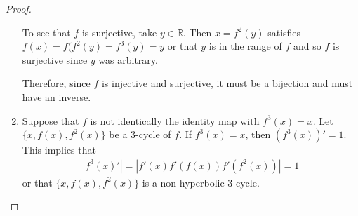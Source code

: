\begin{proof}
\begin{enumerate}
      To see that $f$ is surjective, take $y \in \mathbb{R}$. Then $x = f^2(y)$
      satisfies $f(x) = f(f^2(y) = f^3(y) = y$ or that $y$ is in the range of $f$
      and so $f$ is surjective since $y$ was arbitrary.

      Therefore, since $f$ is injective and surjective, it must be a bijection
      and must have an inverse.
    \item Suppose that $f$ is not identically the identity map with $f^3(x) = x$.
      Let $\{x, f(x), f^2(x)\}$ be a 3-cycle of $f$. If $f^3(x) = x$, then $(f^3(x))' = 1$.
      This implies that
      \begin{align*}
        \left|f^3(x)'\right| = \left|f'(x)f'(f(x))f'(f^2(x))\right| = 1
      \end{align*}
      or that $\{x, f(x), f^2(x)\}$ is a non-hyperbolic 3-cycle.
  \end{enumerate}
\end{proof}
\newpage
